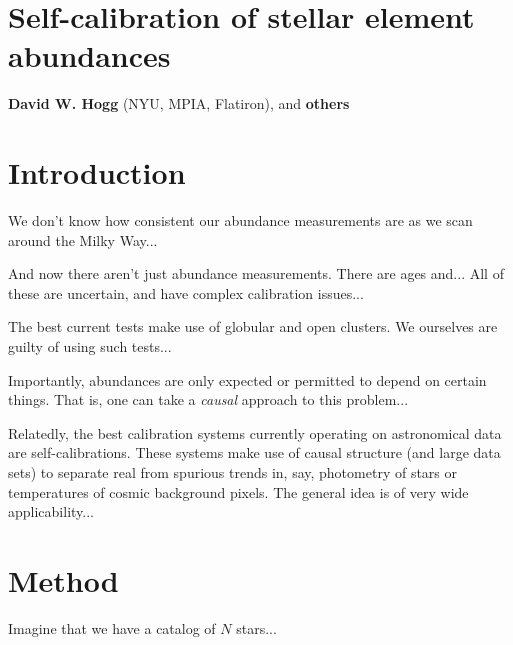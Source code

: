 \documentclass[12pt, letterpaper]{article}
\begin{document}
\section*{Self-calibration of stellar element abundances}
\noindent
\textbf{David W. Hogg} (NYU, MPIA, Flatiron), and \textbf{others}

\section{Introduction}
We don't know how consistent our abundance measurements are as we scan
around the Milky Way...

And now there aren't just abundance measurements.
There are ages and...
All of these are uncertain, and have complex calibration issues...

The best current tests make use of globular and open clusters.
We ourselves are guilty of using such tests...

Importantly, abundances are only expected or permitted to depend on certain
things.
That is, one can take a \emph{causal} approach to this problem...

Relatedly, the best calibration systems currently operating on astronomical
data are self-calibrations.
These systems make use of causal structure (and large data sets) to
separate real from spurious trends in, say, photometry of stars or
temperatures of cosmic background pixels.
The general idea is of very wide applicability...

\section{Method}
Imagine that we have a catalog of $N$ stars...
\end{document}
